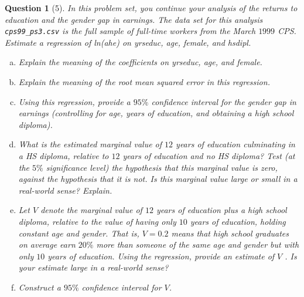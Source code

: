 \documentclass[12pt,reqno]{amsart}
\theoremstyle{plain}
\newtheorem*{theorem*}{Question}
\begin{document}
\begin{theorem*}[5]
    \normalfont
    In this problem set, you continue your analysis of the returns to education and the gender gap
    in earnings. The data set for this analysis \texttt{cps99\_ps3.csv} is the full sample of
    full-time workers from the March $ 1999 $ CPS. Estimate a regression of ln(\textit{ahe}) on
    \textit{yrseduc}, \textit{age}, \textit{female}, and \textit{hsdipl}.
    \begin{enumerate}[(a)]
        \item Explain the meaning of the coefficients on \textit{yrseduc}, \textit{age}, and \textit{female}.
        \item Explain the meaning of the root mean squared error in this regression.
        \item Using this regression, provide a $ 95\% $ confidence interval for the gender gap in
              earnings (controlling for \textit{age}, \textit{years} of \textit{education}, and obtaining
              a high school diploma).
        \item What is the estimated marginal value of $ 12 $ years of education culminating in a HS
              diploma, relative to $ 12 $ years of education and no HS diploma? Test (at the $ 5\% $
              significance level) the hypothesis that this marginal value is zero, against the hypothesis
              that it is not. Is this marginal value large or small in a real-world sense? Explain.
        \item Let $ V $ denote the marginal value of $ 12 $ years of education plus a high school
              diploma, relative to the value of having only $ 10 $ years of education, holding constant
              age and gender. That is, $ V = 0.2 $ means that high school graduates on average earn $ 20\% $
              more than someone of the same age and gender but with only $ 10 $ years of education.
              Using the regression, provide an estimate of $ V $ . Is your estimate large in a real-world sense?
        \item Construct a $ 95\% $ confidence interval for $ V $.
    \end{enumerate}
\end{theorem*}
\end{document}
